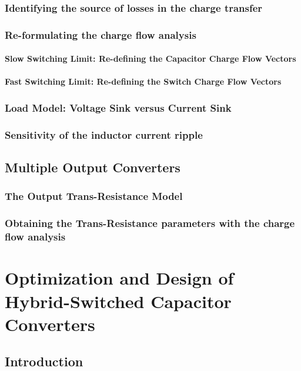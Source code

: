 \subsection{Identifying the source of losses in the charge transfer}
\subsection{Re-formulating the charge flow analysis}
\subsubsection[SSL Capacitor Charge Flow]{Slow Switching Limit: Re-defining the Capacitor Charge Flow Vectors}
\subsubsection[FSL Switch Charge Flow]{Fast Switching Limit: Re-defining the Switch Charge Flow Vectors}

\subsection{Load Model: Voltage Sink versus Current Sink}
\subsection{Sensitivity of the inductor current ripple}

\section{Multiple Output Converters}
\subsection{The Output Trans-Resistance Model}
\subsection{Obtaining the Trans-Resistance parameters with the charge flow analysis }



\chapter[Optimization and Design]{Optimization and Design of Hybrid-Switched Capacitor Converters}
\section{Introduction}
